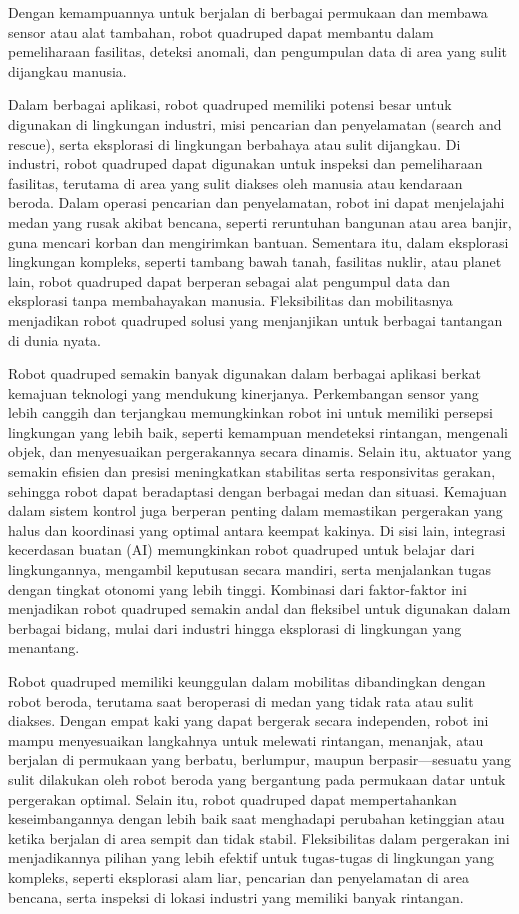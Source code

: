 Dengan kemampuannya untuk berjalan di berbagai permukaan dan membawa sensor atau alat tambahan,
robot quadruped dapat membantu dalam pemeliharaan fasilitas, deteksi anomali,
dan pengumpulan data di area yang sulit dijangkau manusia.

Dalam berbagai aplikasi, robot quadruped memiliki potensi besar untuk digunakan
di lingkungan industri, misi pencarian dan penyelamatan (search and rescue),
serta eksplorasi di lingkungan berbahaya atau sulit dijangkau.
Di industri, robot quadruped dapat digunakan untuk inspeksi dan pemeliharaan fasilitas,
terutama di area yang sulit diakses oleh manusia atau kendaraan beroda.
Dalam operasi pencarian dan penyelamatan, robot ini dapat menjelajahi medan yang rusak akibat bencana,
seperti reruntuhan bangunan atau area banjir, guna mencari korban dan mengirimkan bantuan.
Sementara itu, dalam eksplorasi lingkungan kompleks, seperti tambang bawah tanah,
fasilitas nuklir, atau planet lain, robot quadruped dapat berperan
sebagai alat pengumpul data dan eksplorasi tanpa membahayakan manusia.
Fleksibilitas dan mobilitasnya menjadikan robot quadruped solusi yang menjanjikan untuk berbagai tantangan di dunia nyata.

Robot quadruped semakin banyak digunakan dalam berbagai aplikasi berkat
kemajuan teknologi yang mendukung kinerjanya.
Perkembangan sensor yang lebih canggih dan terjangkau memungkinkan robot ini
untuk memiliki persepsi lingkungan yang lebih baik, seperti kemampuan mendeteksi rintangan,
mengenali objek, dan menyesuaikan pergerakannya secara dinamis.
Selain itu, aktuator yang semakin efisien dan presisi meningkatkan stabilitas
serta responsivitas gerakan, sehingga robot dapat beradaptasi dengan berbagai medan dan situasi.
Kemajuan dalam sistem kontrol juga berperan penting dalam memastikan pergerakan yang halus
dan koordinasi yang optimal antara keempat kakinya.
Di sisi lain, integrasi kecerdasan buatan (AI) memungkinkan robot quadruped
untuk belajar dari lingkungannya, mengambil keputusan secara mandiri,
serta menjalankan tugas dengan tingkat otonomi yang lebih tinggi.
Kombinasi dari faktor-faktor ini menjadikan robot quadruped semakin andal
dan fleksibel untuk digunakan dalam berbagai bidang,
mulai dari industri hingga eksplorasi di lingkungan yang menantang.

Robot quadruped memiliki keunggulan dalam mobilitas dibandingkan dengan robot beroda,
terutama saat beroperasi di medan yang tidak rata atau sulit diakses.
Dengan empat kaki yang dapat bergerak secara independen,
robot ini mampu menyesuaikan langkahnya untuk melewati rintangan,
menanjak, atau berjalan di permukaan yang berbatu, berlumpur,
maupun berpasir—sesuatu yang sulit dilakukan oleh robot beroda yang bergantung
pada permukaan datar untuk pergerakan optimal.
Selain itu, robot quadruped dapat mempertahankan keseimbangannya dengan lebih baik
saat menghadapi perubahan ketinggian atau ketika berjalan di area sempit dan tidak stabil.
Fleksibilitas dalam pergerakan ini menjadikannya pilihan yang lebih efektif
untuk tugas-tugas di lingkungan yang kompleks, seperti eksplorasi alam liar,
pencarian dan penyelamatan di area bencana, serta inspeksi di lokasi industri yang memiliki banyak rintangan.

